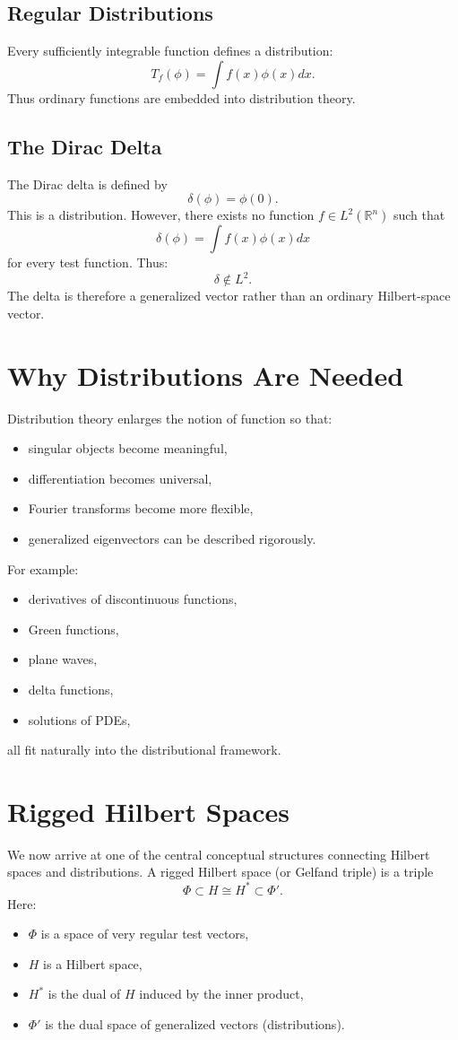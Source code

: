 \documentclass[aps,prl,twocolumn,groupedaddress]{revtex4-2}
\begin{document}
\subsection{Regular Distributions}
Every sufficiently integrable function defines a distribution:
\[
T_f(\phi) = \int f(x)\phi(x)dx.
\]
Thus ordinary functions are embedded into distribution theory.

\subsection{The Dirac Delta}
The Dirac delta is defined by 
\[
\delta(\phi) = \phi(0).
\]
This is a distribution. However, there exists no function $f \in L^2(\mathbb{R}^n)$ such that 
\[
\delta(\phi) = \int f(x)\phi(x)dx 
\]
for every test function. Thus:
\[
\delta \notin L^2.
\]
The delta is therefore a generalized vector rather than an ordinary Hilbert-space vector.

\section{Why Distributions Are Needed}

Distribution theory enlarges the notion of function so that:
\begin{itemize}
\item singular objects become meaningful,
\item differentiation becomes universal,
\item Fourier transforms become more flexible,
\item generalized eigenvectors can be described rigorously.
\end{itemize}
For example:
\begin{itemize}
\item derivatives of discontinuous functions,
\item Green functions,
\item plane waves,
\item delta functions,
\item solutions of PDEs,
\end{itemize}
all fit naturally into the distributional framework.



\section{Rigged Hilbert Spaces}

We now arrive at one of the central conceptual structures connecting Hilbert spaces and distributions. A rigged Hilbert space (or Gelfand triple) is a triple 
\[
\Phi \subset H \cong H^* \subset \Phi'.
\]
Here:
\begin{itemize}
\item $\Phi$ is a space of very regular test vectors,
\item $H$ is a Hilbert space,
\item $H^*$ is the dual of $H$ induced by the inner product,
\item $\Phi'$ is the dual space of generalized vectors (distributions).
\end{itemize}
\end{document}
